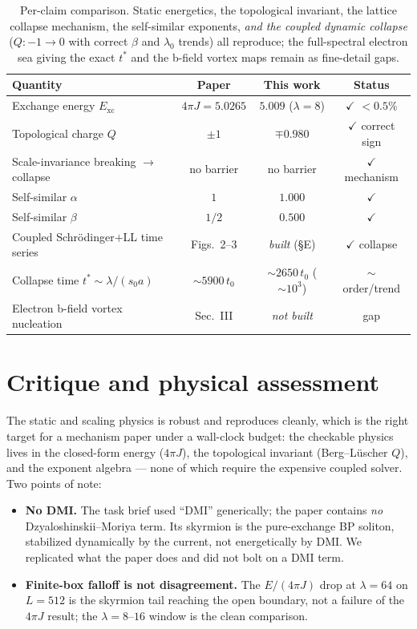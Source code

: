 \documentclass[11pt]{article}
\begin{document}
\begin{table}[h]
\centering
\begin{tabular}{lccc}
\toprule
Quantity & Paper & This work & Status \\
\midrule
Exchange energy $E_{\mathrm{xc}}$          & $4\pi J=5.0265$ & $5.009$ ($\lambda=8$) & $\checkmark$ $<0.5\%$ \\
Topological charge $Q$                      & $\pm1$          & $\mp0.980$            & $\checkmark$ correct sign \\
Scale-invariance breaking $\to$ collapse    & no barrier      & no barrier            & $\checkmark$ mechanism \\
Self-similar $\alpha$                        & $1$             & $1.000$               & $\checkmark$ \\
Self-similar $\beta$                         & $1/2$           & $0.500$               & $\checkmark$ \\
Coupled Schr\"odinger$+$LL time series       & Figs.~2--3      & \emph{built} (\S E)    & $\checkmark$ collapse \\
Collapse time $t^*\sim\lambda/(s_0a)$        & $\sim5900\,t_0$ & $\sim2650\,t_0$ ($\sim\!10^3$) & $\sim$ order/trend \\
Electron b-field vortex nucleation           & Sec.~III        & \emph{not built}      & gap \\
\bottomrule
\end{tabular}
\caption{Per-claim comparison. Static energetics, the topological invariant, the
lattice collapse mechanism, the self-similar exponents, \emph{and the coupled
dynamic collapse} ($Q:-1\!\to\!0$ with correct $\beta$ and $\lambda_0$ trends)
all reproduce; the full-spectral electron sea giving the exact $t^*$ and the
b-field vortex maps remain as fine-detail gaps.}
\end{table}

\section{Critique and physical assessment}

The static and scaling physics is robust and reproduces cleanly, which is the
right target for a mechanism paper under a wall-clock budget: the checkable
physics lives in the closed-form energy ($4\pi J$), the topological invariant
(Berg--L\"uscher $Q$), and the exponent algebra --- none of which require the
expensive coupled solver. Two points of note:
\begin{itemize}
\item \textbf{No DMI.} The task brief used ``DMI'' generically; the paper contains
      \emph{no} Dzyaloshinskii--Moriya term. Its skyrmion is the pure-exchange BP
      soliton, stabilized dynamically by the current, not energetically by DMI.
      We replicated what the paper does and did not bolt on a DMI term.
\item \textbf{Finite-box falloff is not disagreement.} The $E/(4\pi J)$ drop at
      $\lambda=64$ on $L=512$ is the skyrmion tail reaching the open boundary,
      not a failure of the $4\pi J$ result; the $\lambda=8$--$16$ window is the
      clean comparison.
\end{itemize}
\end{document}
